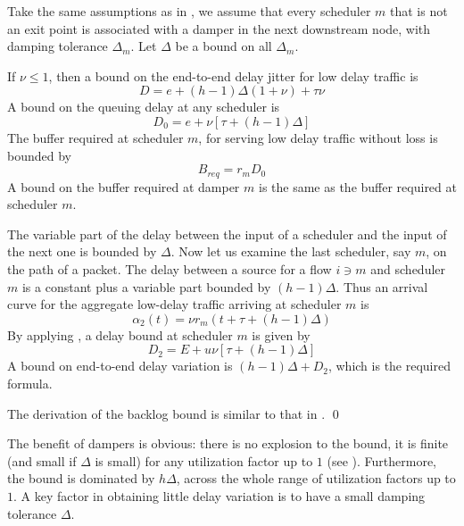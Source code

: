 \begin{theorem}
 Take the same assumptions as in , we
assume that every scheduler $m$ that is not an exit point is
associated with a damper in the next downstream node, with damping
tolerance $\Delta_m$. Let $\Delta$ be a bound on all $\Delta_m$.

If $\nu \leq 1$, then a bound on the end-to-end delay jitter for
low delay traffic is
$$
D  = e + (h-1) \Delta (1 +  \nu) + \tau \nu
$$
A bound on the queuing delay at any scheduler is
 $$
 D_0 = e +  \nu  [\tau + (h-1) \Delta]
 $$
The buffer required at scheduler $m$, for serving low delay
traffic without loss is bounded by
$$
B_{req}=  r_m D_0
$$
A bound on the buffer required at damper $m$ is the same as the
buffer required at scheduler $m$.
\end{theorem}
\pr
The variable part of the delay between the input of a scheduler
and the input of the next one is bounded by $\Delta$. Now let us
examine the last scheduler, say $m$, on the path of a packet. The
delay between a source for a flow $i \ni m$ and scheduler $m$ is a
constant plus a variable part bounded by $(h-1)\Delta$. Thus an
arrival curve for the aggregate low-delay traffic arriving at
scheduler $m$ is
$$
\alpha_2(t)= \nu r_m (t + \tau + (h-1) \Delta)
$$
By applying , a delay bound at scheduler $m$ is
given by
$$D_2 = E + u \nu  [\tau + (h-1) \Delta]
$$
A bound on end-to-end delay variation is $(h-1) \Delta + D_2$,
which is the required formula.

The derivation of the backlog bound is similar to that in
. \qed

The benefit of dampers is obvious: there is no explosion to the
bound, it is finite (and small if $\Delta$ is small) for any
utilization factor up to $1$ (see ).
Furthermore, the bound is dominated by $h \Delta$, across the
whole range of utilization factors up to $1$. A key factor in
obtaining little delay variation is to have a small damping
tolerance $\Delta$.
\begin{figure}[!htbp]
\end{figure}

